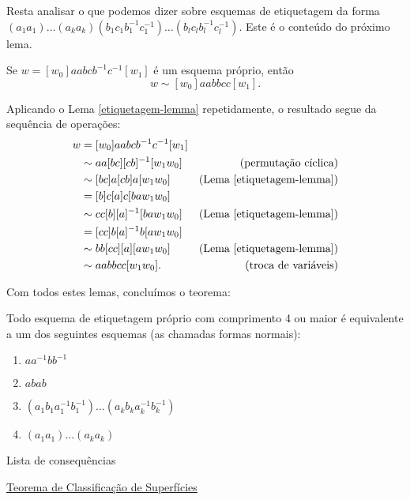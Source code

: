 Resta analisar o que podemos dizer sobre esquemas de etiquetagem da forma $(a_1 a_1)\ldots (a_k a_k) (b_1 c_1 b_1^{-1} c_1^{-1})\ldots (b_l c_l b_l^{-1} c_l^{-1})$. Este é o conteúdo do próximo lema.

\begin{lemma}
    Se $w = [w_0] aa bcb^{-1}c^{-1} [w_1]$ é um esquema próprio, então
    \[w \sim [w_0] aa bb cc [w_1].\]

    \begin{dem}
        Aplicando o Lema \ref{etiquetagem-lemma} repetidamente, o resultado segue da sequência de operações:
        \begin{alignat*}{2}
            w &= [w_0] aa bcb^{-1}c^{-1} [w_1]
            &~\\
            &\sim aa [bc][cb]^{-1} [w_1 w_0]
            &\text{(permutação cíclica)}\\
            &\sim [bc] a[cb] a [w_1 w_0]
            &\text{(Lema \ref{etiquetagem-lemma})}\\
            &= [b]c[a]c[ba w_1 w_0]&~\\
            &\sim cc[b][a]^{-1}[ba w_1 w_0]&\text{(Lema \ref{etiquetagem-lemma})}\\
            &= [cc]b[a]^{-1}b[a w_1 w_0]&~\\
            &\sim bb[cc][a][a w_1 w_0]&\text{(Lema \ref{etiquetagem-lemma})}\\
            &\sim aabbcc [w_1 w_0].&\text{(troca de variáveis)}
        \end{alignat*}
    \end{dem}
\end{lemma}

Com todos estes lemas, concluímos o teorema:

\begin{thm}
    Todo esquema de etiquetagem próprio com comprimento 4 ou maior é equivalente a um dos seguintes esquemas (as chamadas formas normais):
    \begin{enumerate}
        \item $aa^{-1}bb^{-1}$
        \item $abab$
        \item $(a_1 b_1 a_1^{-1} b_1^{-1})\ldots (a_k b_k a_k^{-1} b_k^{-1})$
        \item $(a_1 a_1)\ldots (a_k a_k)$
    \end{enumerate}
\end{thm}

\begin{titlemize}{Lista de consequências}
	\item \hyperref[classificacao-superficies-thm]{Teorema de Classificação de Superfícies}
\end{titlemize}